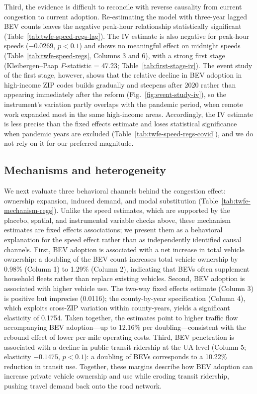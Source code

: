 \documentclass[11pt, letterpaper]{article}
\begin{document}
Third, the evidence is difficult to reconcile with reverse causality from current congestion to current adoption.
Re-estimating the model with three-year lagged BEV counts leaves the negative peak-hour relationship statistically significant (Table~\ref{tab:twfe-speed-regs-lag}).
The IV estimate is also negative for peak-hour speeds ($-0.0269$, $p<0.1$) and shows no meaningful effect on midnight speeds (Table~\ref{tab:twfe-speed-regs}, Columns 3 and 6), with a strong first stage (Kleibergen--Paap \textit{F}-statistic = 47.23; Table~\ref{tab:first-stage-iv}).
The event study of the first stage, however, shows that the relative decline in BEV adoption in high-income ZIP codes builds gradually and steepens after 2020 rather than appearing immediately after the reform (Fig.~\ref{fig:event-study-iv}), so the instrument's variation partly overlaps with the pandemic period, when remote work expanded most in the same high-income areas.
Accordingly, the IV estimate is less precise than the fixed effects estimate and loses statistical significance when pandemic years are excluded (Table~\ref{tab:twfe-speed-regs-covid}), and we do not rely on it for our preferred magnitude.

\subsection{Mechanisms and heterogeneity}
We next evaluate three behavioral channels behind the congestion effect: ownership expansion, induced demand, and modal substitution (Table~\ref{tab:twfe-mechanism-regs}).
Unlike the speed estimates, which are supported by the placebo, spatial, and instrumental variable checks above, these mechanism estimates are fixed effects associations; we present them as a behavioral explanation for the speed effect rather than as independently identified causal channels.
First, BEV adoption is associated with a net increase in total vehicle ownership: a doubling of the BEV count increases total vehicle ownership by 0.98\% (Column 1) to 1.29\% (Column 2), indicating that BEVs often supplement household fleets rather than replace existing vehicles.
Second, BEV adoption is associated with higher vehicle use.
The two-way fixed effects estimate (Column 3) is positive but imprecise (0.0116); the county-by-year specification (Column 4), which exploits cross-ZIP variation within county-years, yields a significant elasticity of 0.1754.
Taken together, the estimates point to higher traffic flow accompanying BEV adoption---up to 12.16\% per doubling---consistent with the rebound effect of lower per-mile operating costs.
Third, BEV penetration is associated with a decline in public transit ridership at the UA level (Column 5; elasticity $-0.1475$, $p<0.1$): a doubling of BEVs corresponds to a 10.22\% reduction in transit use.
Together, these margins describe how BEV adoption can increase private vehicle ownership and use while eroding transit ridership, pushing travel demand back onto the road network.
\end{document}
